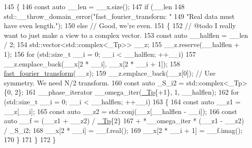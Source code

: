 \begin{DoxyCode}
145     \{
146       \textcolor{keyword}{const} \textcolor{keyword}{auto} \_\_len = \_\_x.size();
147       \textcolor{keywordflow}{if} (\_\_len %
148         std::\_\_throw\_domain\_error(\textcolor{stringliteral}{"fast\_fourier\_transform: "}
149                                   \textcolor{stringliteral}{"Real data must have even length."});
150       \textcolor{keywordflow}{else} \textcolor{comment}{// Good, we're even.}
151         \{
152           \textcolor{comment}{// @todo I really want to just make a view to a complex vector.}
153           \textcolor{keyword}{const} \textcolor{keyword}{auto} \_\_halflen = \_\_len / 2;
154           std::vector<std::complex<\_Tp>> \_\_z;
155           \_\_z.reserve(\_\_halflen + 1);
156           \textcolor{keywordflow}{for} (std::size\_t \_\_i = 0; \_\_i < \_\_halflen; ++\_\_i)
157             \_\_z.emplace\_back(\_\_x[2 * \_\_i], \_\_x[2 * \_\_i + 1]);
158           \hyperlink{namespace____gnu__cxx_a64fbc0765e55d7466a21baa9f652362e}{fast\_fourier\_transform}(\_\_z);
159           \_\_z.emplace\_back(\_\_z[0]); \textcolor{comment}{// Use symmetry.  We need N/2 transform.}
160           \textcolor{keyword}{const} \textcolor{keyword}{auto} \_S\_i2 = std::complex<\_Tp>\{0, 2\};
161           \_\_phase\_iterator \_\_omega\_iter(\hyperlink{namespace____gnu__cxx_a3b19a9c800ca194374ef9172290f7d79}{\_Tp}\{+1\}, 1, \_\_halflen);
162           \textcolor{keywordflow}{for} (std::size\_t \_\_i = 0; \_\_i < \_\_halflen; ++\_\_i)
163             \{
164               \textcolor{keyword}{const} \textcolor{keyword}{auto} \_\_z1 = \_\_z[\_\_i];
165               \textcolor{keyword}{const} \textcolor{keyword}{auto} \_\_z2 = std::conj(\_\_z[\_\_halflen - \_\_i]);
166               \textcolor{keyword}{const} \textcolor{keyword}{auto} \_\_f = (\_\_z1 + \_\_z2) / \hyperlink{namespace____gnu__cxx_a3b19a9c800ca194374ef9172290f7d79}{\_Tp}\{2\}
167                              + *\_\_omega\_iter * (\_\_z1 - \_\_z2) / \_S\_i2;
168               \_\_x[2 * \_\_i] = \_\_f.real();
169               \_\_x[2 * \_\_i + 1] = \_\_f.imag();
170             \}
171         \}
172     \}
\end{DoxyCode}
\mbox{\label{namespace____gnu__cxx_a8e1dab366323a810c9915329b520aa5a}} 
